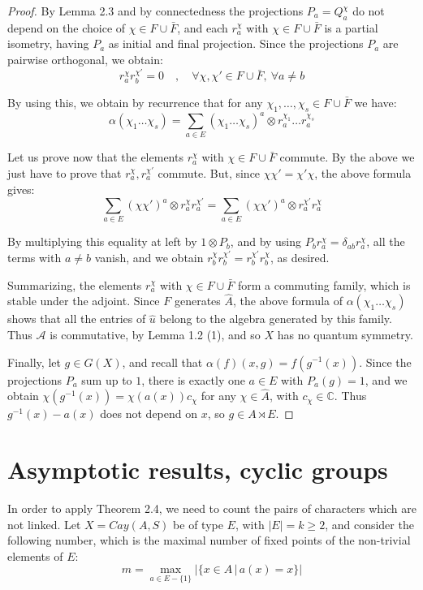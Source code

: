 \documentclass[11pt]{amsart}
\newcommand{\A}{\mathcal A}
\newcommand{\CC}{\mathbb C}
\newcommand{\hA}{\widehat A}
\newcommand{\hu}{\widehat u}
\begin{document}
\begin{proof}
By Lemma 2.3 and by connectedness the projections $P_a=Q^\chi_a$ do not depend on the choice of $\chi\in F\cup\bar{F}$, and each $r^\chi_a$ with $\chi\in F\cup\bar{F}$ is a partial isometry, having $P_a$ as initial and final projection. Since the projections $P_a$ are pairwise orthogonal, we obtain:
$$r^\chi_ar^{\chi'}_b=0\quad,\quad\forall\chi,\chi'\in F\cup\bar{F},\ \forall a\neq b$$

By using this, we obtain by recurrence that for any $\chi_1,\ldots,\chi_s\in F\cup\bar{F}$ we have:
$$\alpha(\chi_1\ldots\chi_s)=\sum_{a\in E}(\chi_1\ldots\chi_s)^a\otimes r^{\chi_1}_a\ldots r^{\chi_s}_a$$

Let us prove now that the elements $r^\chi_a$ with $\chi\in F\cup\bar{F}$ commute. By the above we just have to prove that $r^\chi_a,r^{\chi'}_a$ commute. But, since $\chi\chi'=\chi'\chi$, the above formula gives:
$$\sum_{a\in E}(\chi\chi')^a\otimes r^\chi_ar^{\chi'}_a=\sum_{a\in E}(\chi\chi')^a\otimes r^{\chi'}_ar^\chi_a$$

By multiplying this equality at left by $1\otimes P_b$, and by using $P_br^\chi_a=\delta_{ab}r^\chi_a$, all the terms with $a\neq b$ vanish, and we obtain $r^\chi_br^{\chi'}_b=r^{\chi'}_br^\chi_b$, as desired.

Summarizing, the elements $r^\chi_a$ with $\chi\in F\cup\bar{F}$ form a commuting family, which is stable under the adjoint. Since $F$ generates $\hA$, the above formula of $\alpha(\chi_1\ldots\chi_s)$ shows that all the entries of $\hu$ belong to the algebra generated by this family. Thus $\A$ is commutative, by Lemma 1.2 (1), and so $X$ has no quantum symmetry.

Finally, let $g\in G(X)$, and recall that $\alpha(f)(x,g)=f(g^{-1}(x))$. Since the projections $P_a$ sum up to $1$, there is exactly one $a\in E$ with $P_a(g)=1$, and we obtain $\chi(g^{-1}(x))=\chi(a(x))c_\chi$ for any $\chi\in\hA$, with $c_\chi\in\CC$. Thus $g^{-1}(x)-a(x)$ does not depend on $x$, so $g\in A\rtimes E$.
\end{proof}

\section{Asymptotic results, cyclic groups}

In order to apply Theorem 2.4, we need to count the pairs of characters which are not linked. Let $X=Cay(A,S)$ be of type $E$, with $|E|=k\geq2$, and consider the following number, which is the maximal number of fixed points of the non-trivial elements of $E$:
$$m=\max_{a\in E-\{1\}}\big|\{x\in A\,|\,a(x)=x\}\big|$$
\end{document}
